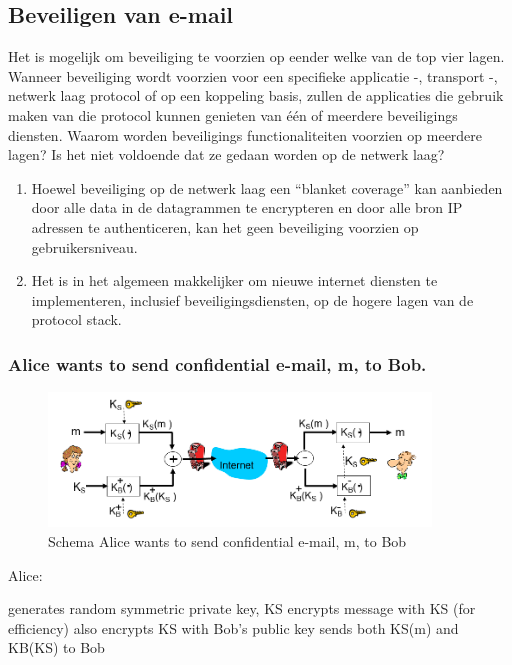 \subsection{Beveiligen van e-mail}

Het is mogelijk om beveiliging te voorzien op eender welke van de top vier lagen. Wanneer beveiliging wordt voorzien voor een specifieke applicatie -, transport -, netwerk laag protocol of op een koppeling basis, zullen de applicaties die gebruik maken van die protocol kunnen genieten van één of meerdere beveiligings diensten.
Waarom worden beveiligings functionaliteiten voorzien op meerdere lagen? Is het niet voldoende dat ze gedaan worden op de netwerk laag?
\begin{enumerate}
    \item	Hoewel beveiliging op de netwerk laag een “blanket coverage” kan aanbieden door alle data in de datagrammen te encrypteren en door alle bron IP adressen te authenticeren, kan het geen beveiliging voorzien op gebruikersniveau.
    \item Het is in het algemeen makkelijker om nieuwe internet diensten te implementeren,
    inclusief beveiligingsdiensten, op de hogere lagen van de protocol stack.
\end{enumerate}

\subsubsection{Alice wants to send confidential e-mail, m, to Bob.}

\begin{figure}[h]
    \centering
    \includegraphics[width=4in]{./img/imghfdst8/hfdst8puntje23.png}
    \caption{Schema Alice wants to send confidential e-mail, m, to Bob }      
    \label{fig:Schema Alice wants to send confidential e-mail, m, to Bob }
\end{figure}

\noindent Alice:

\bi
\itf generates random symmetric private key, KS
\itf encrypts message with KS  (for efficiency)
\itf also encrypts KS with Bob’s public key
\itf sends both KS(m) and KB(KS) to Bob
\ei

